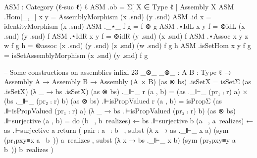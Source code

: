   ASM : Category (ℓ-suc ℓ) ℓ
  ASM .ob = Σ[ X ∈ Type ℓ ] Assembly X
  ASM .Hom[_,_] x y = AssemblyMorphism (x .snd) (y .snd)
  ASM .id {x} = identityMorphism (x .snd)
  ASM ._⋆_ f g = f ⊚ g
  ASM .⋆IdL {x} {y} f = ⊚idL (x .snd) (y .snd) f
  ASM .⋆IdR {x} {y} f = ⊚idR (y .snd) (x .snd) f
  ASM .⋆Assoc {x} {y} {z} {w} f g h = ⊚assoc (x .snd) (y .snd) (z .snd) (w .snd) f g h
  ASM .isSetHom {x} {y} f g = isSetAssemblyMorphism (x .snd) (y .snd) f g
  
  -- Some constructions on assemblies
  infixl 23 _⊗_
  _⊗_ : {A B : Type ℓ} → Assembly A → Assembly B → Assembly (A × B)
  (as ⊗ bs) .isSetX = isSetΣ (as .isSetX) (λ _ → bs .isSetX)
  (as ⊗ bs) ._⊩_ r (a , b) = (as ._⊩_ (pr₁ ⨾ r) a) × (bs ._⊩_ (pr₂ ⨾ r) b)
  (as ⊗ bs) .⊩isPropValued r (a , b) = isPropΣ (as .⊩isPropValued (pr₁ ⨾ r) a)
                                                (λ _ → bs .⊩isPropValued (pr₂ ⨾ r) b)
  (as ⊗ bs) .⊩surjective (a , b) = do
                                   (b~ , b~realizes) ← bs .⊩surjective b
                                   (a~ , a~realizes) ← as .⊩surjective a
                                   return
                                     ( pair ⨾ a~ ⨾ b~
                                     , subst (λ x → as ._⊩_ x a) (sym (pr₁pxy≡x a~ b~)) a~realizes
                                     , subst (λ x → bs ._⊩_ x b) (sym (pr₂pxy≡y a~ b~)) b~realizes
                                     )

